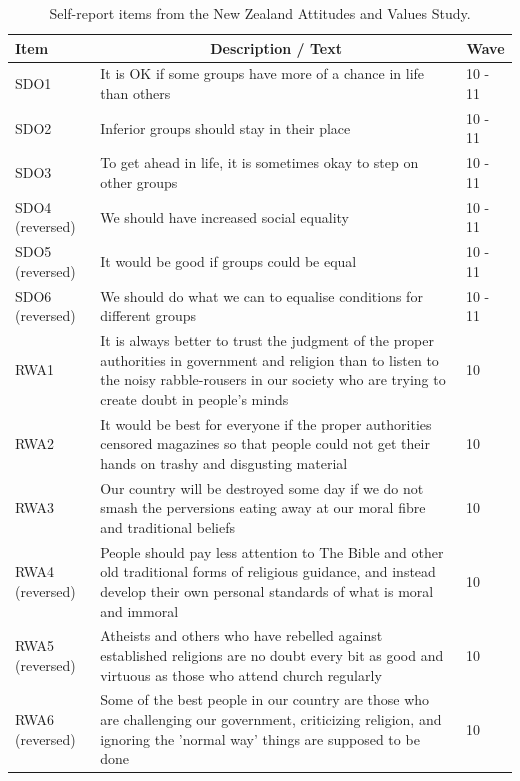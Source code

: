 \documentclass[
  man,floatsintext]{apa6}
\begin{document}
\begin{table}[h]

\begin{center}
\begin{threeparttable}

\caption{\label{tab:itemTable}Self-report items from the New Zealand Attitudes and Values Study.}

\footnotesize{

\begin{tabular}{p{4.2cm}p{9cm}p{1cm}}
\toprule
Item & \multicolumn{1}{c}{Description / Text} & \multicolumn{1}{c}{Wave}\\
\midrule
SDO1 & It is OK if some groups have more of a chance in life than others & 10 - 11\\
SDO2 & Inferior groups should stay in their place & 10 - 11\\
SDO3 & To get ahead in life, it is sometimes okay to step on other groups & 10 - 11\\
SDO4 (reversed) & We should have increased social equality & 10 - 11\\
SDO5 (reversed) & It would be good if groups could be equal & 10 - 11\\
SDO6 (reversed) & We should do what we can to equalise conditions for different groups & 10 - 11\\
RWA1 & It is always better to trust the judgment of the proper authorities in government and religion than to listen to the noisy rabble-rousers in our society who are trying to create doubt in people's minds & 10\\
RWA2 & It would be best for everyone if the proper authorities censored magazines so that people could not get their hands on trashy and disgusting material & 10\\
RWA3 & Our country will be destroyed some day if we do not smash the perversions eating away at our moral fibre and traditional beliefs & 10\\
RWA4 (reversed) & People should pay less attention to The Bible and other old traditional forms of religious guidance, and instead develop their own personal standards of what is moral and immoral & 10\\
RWA5 (reversed) & Atheists and others who have rebelled against established religions are no doubt every bit as good and virtuous as those who attend church regularly & 10\\
RWA6 (reversed) & Some of the best people in our country are those who are challenging our government, criticizing religion, and ignoring the 'normal way' things are supposed to be done & 10\\

\end{tabular}}
\end{threeparttable}
\end{center}
\end{table}
\end{document}
